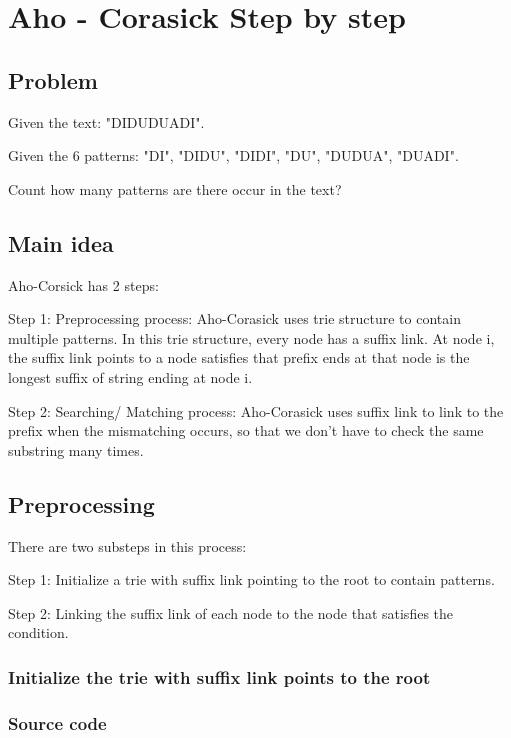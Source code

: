 \section{Aho - Corasick Step by step}

\subsection{Problem}
Given the text: "DIDUDUADI".

Given the 6 patterns: "DI", "DIDU", "DIDI", "DU", "DUDUA", "DUADI".

Count how many patterns are there occur in the text?

\subsection{Main idea\cite{stanford}}
Aho-Corsick has 2 steps:

Step 1: Preprocessing process: Aho-Corasick uses trie structure to contain multiple patterns. In this trie structure, every node has a suffix link. At node i, the suffix link points to a node satisfies that prefix ends at that node is the longest suffix of string ending at node i.

Step 2: Searching/ Matching process: Aho-Corasick uses suffix link to link to the prefix when the mismatching occurs, so that we don’t have to check the same substring many times.
\subsection{Preprocessing\cite{vnoj}\cite{CpAlgor}}
There are two substeps in this process:

Step 1: Initialize a trie with suffix link pointing to the root to contain patterns.

Step 2: Linking the suffix link of each node to the node that satisfies the condition.

\subsubsection*{Initialize the trie with suffix link points to the root}
\pagebreak
\subsubsection*{Source code}

